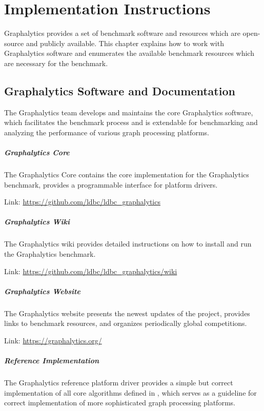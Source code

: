 \chapter{Implementation Instructions}
\label{chap:instructions}
Graphalytics provides a set of benchmark software and resources which are open-source and publicly available. This chapter explains how to work with Graphalytics software and enumerates the available benchmark resources which are necessary for the benchmark.



\section{Graphalytics Software and Documentation}\label{sec:instructions:core}
The Graphalytics team develops and maintains the core Graphalytics software, which facilitates the benchmark process and is extendable for benchmarking and analyzing the performance of various graph processing platforms.

\paragraph{Graphalytics Core} The Graphalytics Core contains the core implementation for the Graphalytics benchmark, provides a programmable interface for platform drivers.

\quad Link: \url{https://github.com/ldbc/ldbc_graphalytics}


\paragraph{Graphalytics Wiki} The Graphalytics wiki provides detailed instructions on how to install and run the Graphalytics benchmark.

\quad Link: \url{https://github.com/ldbc/ldbc_graphalytics/wiki}


\paragraph{Graphalytics Website} The Graphalytics website presents the newest updates of the project, provides links to benchmark resources, and organizes periodically global competitions.

\quad Link: \url{https://graphalytics.org/}


\paragraph{Reference Implementation} The Graphalytics reference platform driver provides a simple but correct implementation of all core algorithms defined in , which serves as a guideline for correct implementation of more sophisticated graph processing platforms.

